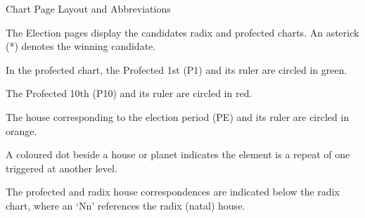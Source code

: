 \begin{frame}[t]{Chart Page Layout and Abbreviations}
\centering
\begin{minipage}{0.8\textwidth}
The Election pages display the candidates radix and profected charts. An asterick (*) denotes the winning candidate. 
\vspace{1em}

In the profected chart, the Profected 1st (P1) and its ruler are circled in {\dgreen green}.
\vspace{1em}

The Profected 10th (P10) and its ruler are circled in {\red red}.
\vspace{1em}

The house corresponding to the election period (PE) and its ruler are circled in \color {orange} orange. \color{black}
\vspace{1em}

A coloured dot beside a house or planet indicates the element is a repeat of one triggered at another level.
\vspace{1em}

The profected and radix house correspondences are indicated below the radix chart, where an `Nn' references the radix (natal) house.
\end{minipage}
\end{frame}